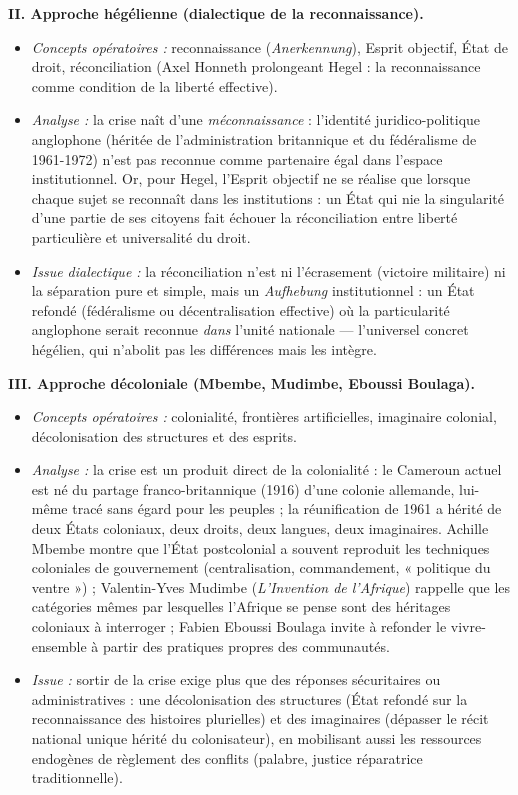 \documentclass[11pt]{article}
\begin{document}
\begin{corrige}
\textbf{II. Approche hégélienne (dialectique de la reconnaissance).}
\begin{itemize}
\item \emph{Concepts opératoires :} reconnaissance (\emph{Anerkennung}), Esprit objectif, État de droit, réconciliation (Axel Honneth prolongeant Hegel : la reconnaissance comme condition de la liberté effective).
\item \emph{Analyse :} la crise naît d'une \emph{méconnaissance} : l'identité juridico-politique anglophone (héritée de l'administration britannique et du fédéralisme de 1961-1972) n'est pas reconnue comme partenaire égal dans l'espace institutionnel. Or, pour Hegel, l'Esprit objectif ne se réalise que lorsque chaque sujet se reconnaît dans les institutions : un État qui nie la singularité d'une partie de ses citoyens fait échouer la réconciliation entre liberté particulière et universalité du droit.
\item \emph{Issue dialectique :} la réconciliation n'est ni l'écrasement (victoire militaire) ni la séparation pure et simple, mais un \emph{Aufhebung} institutionnel : un État refondé (fédéralisme ou décentralisation effective) où la particularité anglophone serait reconnue \emph{dans} l'unité nationale — l'universel concret hégélien, qui n'abolit pas les différences mais les intègre.
\end{itemize}

\textbf{III. Approche décoloniale (Mbembe, Mudimbe, Eboussi Boulaga).}
\begin{itemize}
\item \emph{Concepts opératoires :} colonialité, frontières artificielles, imaginaire colonial, décolonisation des structures et des esprits.
\item \emph{Analyse :} la crise est un produit direct de la colonialité : le Cameroun actuel est né du partage franco-britannique (1916) d'une colonie allemande, lui-même tracé sans égard pour les peuples ; la réunification de 1961 a hérité de deux États coloniaux, deux droits, deux langues, deux imaginaires. Achille Mbembe montre que l'État postcolonial a souvent reproduit les techniques coloniales de gouvernement (centralisation, commandement, « politique du ventre ») ; Valentin-Yves Mudimbe (\emph{L'Invention de l'Afrique}) rappelle que les catégories mêmes par lesquelles l'Afrique se pense sont des héritages coloniaux à interroger ; Fabien Eboussi Boulaga invite à refonder le vivre-ensemble à partir des pratiques propres des communautés.
\item \emph{Issue :} sortir de la crise exige plus que des réponses sécuritaires ou administratives : une décolonisation des structures (État refondé sur la reconnaissance des histoires plurielles) et des imaginaires (dépasser le récit national unique hérité du colonisateur), en mobilisant aussi les ressources endogènes de règlement des conflits (palabre, justice réparatrice traditionnelle).
\end{itemize}


\end{corrige}
\end{document}
